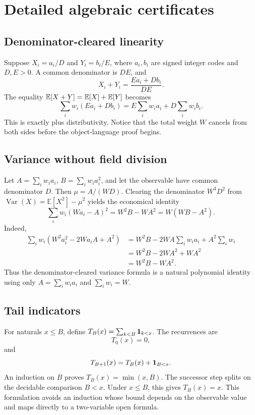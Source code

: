 \section{Detailed algebraic certificates}\label{app:certificates}

\subsection{Denominator-cleared linearity}

Suppose \(X_i=a_i/D\) and \(Y_i=b_i/E\), where \(a_i,b_i\) are signed integer
codes and \(D,E>0\).  A common denominator is \(DE\), and
\[
 X_i+Y_i=\frac{Ea_i+Db_i}{DE}.
\]
The equality \(\mathbb E[X+Y]=\mathbb E[X]+\mathbb E[Y]\) becomes
\[
 \sum_iw_i(Ea_i+Db_i)
 =E\sum_iw_ia_i+D\sum_iw_ib_i.
\]
This is exactly  plus distributivity.  Notice that the total
weight \(W\) cancels from both sides before the object-language proof begins.

\subsection{Variance without field division}

Let \(A=\sum_iw_ia_i\), \(B=\sum_iw_ia_i^2\), and let the observable have
common denominator \(D\).  Then \(\mu=A/(WD)\).  Clearing the denominator
\(W^3D^2\) from
\(\operatorname{Var}(X)=\mathbb E[X^2]-\mu^2\) yields the economical
identity
\[
 \sum_iw_i(Wa_i-A)^2
 =W^2B-WA^2=W(WB-A^2).
\]
Indeed,
\begin{align*}
\sum_iw_i(W^2a_i^2-2Wa_iA+A^2)
&=W^2B-2WA\sum_iw_ia_i+A^2\sum_iw_i\\
&=W^2B-2WA^2+WA^2\\
&=W^2B-WA^2.
\end{align*}
Thus the denominator-cleared variance formula is a natural polynomial identity
using only \(A=\sum_iw_ia_i\) and \(\sum_iw_i=W\).

\subsection{Tail indicators}

For naturals \(x\le B\), define
\(T_B(x)=\sum_{k<B}\mathbf 1_{k<x}\).  The recurrences are
\[
 T_0(x)=0,
\]
and
\[
 T_{B+1}(x)=T_B(x)+\mathbf 1_{B<x}.
\]
An induction on \(B\) proves
\(T_B(x)=\min(x,B)\).  The successor step splits on the decidable comparison
\(B<x\).  Under \(x\le B\), this gives \(T_B(x)=x\).  This formulation avoids
an induction whose bound depends on the observable value and maps directly to
a two-variable open formula.

